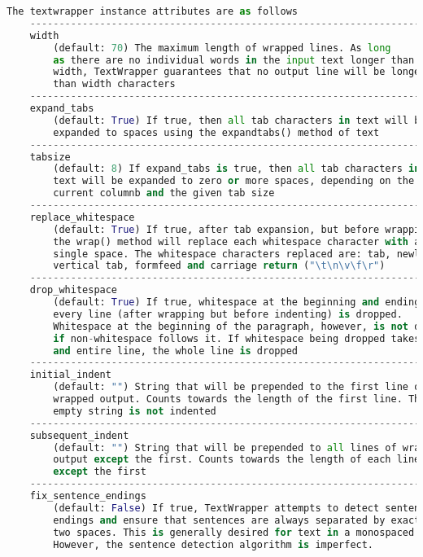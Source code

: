 \documentclass[a4paper,landscape]{report}
\begin{document}
\begin{lstlisting}[language=Python]
    The textwrapper instance attributes are as follows
    --------------------------------------------------------------------
    width
        (default: 70) The maximum length of wrapped lines. As long
        as there are no individual words in the input text longer than
        width, TextWrapper guarantees that no output line will be longer
        than width characters
    --------------------------------------------------------------------
    expand_tabs
        (default: True) If true, then all tab characters in text will be
        expanded to spaces using the expandtabs() method of text
    --------------------------------------------------------------------
    tabsize
        (default: 8) If expand_tabs is true, then all tab characters in 
        text will be expanded to zero or more spaces, depending on the
        current columnb and the given tab size
    --------------------------------------------------------------------
    replace_whitespace
        (default: True) If true, after tab expansion, but before wrapping,
        the wrap() method will replace each whitespace character with a
        single space. The whitespace characters replaced are: tab, newline,
        vertical tab, formfeed and carriage return ("\t\n\v\f\r")
    --------------------------------------------------------------------
    drop_whitespace
        (default: True) If true, whitespace at the beginning and ending of
        every line (after wrapping but before indenting) is dropped. 
        Whitespace at the beginning of the paragraph, however, is not dropped
        if non-whitespace follows it. If whitespace being dropped takes up
        and entire line, the whole line is dropped
    --------------------------------------------------------------------
    initial_indent
        (default: "") String that will be prepended to the first line of
        wrapped output. Counts towards the length of the first line. The
        empty string is not indented
    --------------------------------------------------------------------
    subsequent_indent
        (default: "") String that will be prepended to all lines of wrapped
        output except the first. Counts towards the length of each line
        except the first
    --------------------------------------------------------------------
    fix_sentence_endings
        (default: False) If true, TextWrapper attempts to detect sentence
        endings and ensure that sentences are always separated by exactly
        two spaces. This is generally desired for text in a monospaced font.
        However, the sentence detection algorithm is imperfect. 

\end{lstlisting}
\end{document}
